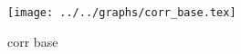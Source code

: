 \begin{figure}[h] \centering\texttt{[image: ../../graphs/corr\_base.tex]}\caption{corr base}\label{gr:corr_base} \end{figure}
